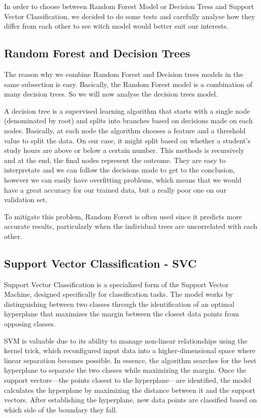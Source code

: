 \documentclass{article}
\begin{document}
In order to choose between Random Forest Model or Decision Tress and Support Vector Classification, we decided to do some tests and carefully analyse how they differ from each other to see witch model would better suit our interests.

\subsection{Random Forest and Decision Trees}

\quad The reason why we combine Random Forest and Decision trees models in the same subsection is easy. Basically, the Random Forest model is a combination of many decision trees. So we will now analyse the decision trees model. 

A decision tree is a supervised learning algorithm that starts with a single node (denominated by root) and splits into branches based on decisions made on each nodes. Basically, at each node the algorithm chooses a feature and a threshold value to split the data. On our case, it might split based on whether a student's study hours are above or below a certain number. This methods is recursively and at the end, the final nodes represent the outcome. They are easy to interpretate and we can follow the decisions made to get to the conclusion, however we can easily have overfitting problems, which means that we would have a great accuracy for our trained data, but a really poor one on our validation set. 

To mitigate this problem, Random Forest is often used since it predicts more accurate results, particularly when the individual trees are uncorrelated with each other.

\subsection{Support Vector Classification - SVC}

\quad Support Vector Classification is a specialized form of the Support Vector Machine, designed specifically for classification tasks. The model works by distinguishing between two classes through the identification of an optimal hyperplane that maximizes the margin between the closest data points from opposing classes.

SVM is valuable due to its ability to manage non-linear relationships using the kernel trick, which reconfigured input data into a higher-dimensional space where linear separation becomes possible. In essence, the algorithm searches for the best hyperplane to separate the two classes while maximizing the margin. Once the support vectors—the points closest to the hyperplane—are identified, the model calculates the hyperplane by maximizing the distance between it and the support vectors. After establishing the hyperplane, new data points are classified based on which side of the boundary they fall.
\end{document}
